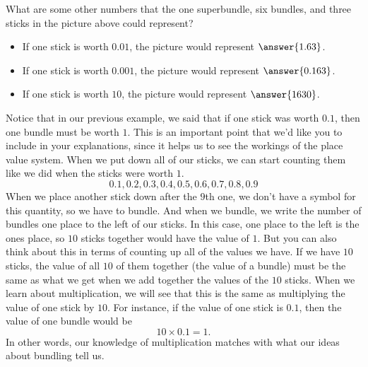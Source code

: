 \documentclass{ximera}
\begin{document}
\begin{example}



\end{example}

\begin{question}
What are some other numbers that the one superbundle, six bundles, and three sticks in the picture above could represent?

\begin{prompt}
\begin{itemize}
	\item If one stick is worth $0.01$, the picture would represent $\answer{1.63}$.
	\item If one stick is worth $0.001$, the picture would represent $\answer{0.163}$.
	\item If one stick is worth $10$, the picture would represent $\answer{1630}$.
\end{itemize}
\end{prompt}
\end{question}

Notice that in our previous example, we said that if one stick was worth $0.1$, then one bundle must be worth $1$. This is an important point that we'd like you to include in your explanations, since it helps us to see the workings of the place value system. When we put down all of our sticks, we can start counting them like we did when the sticks were worth $1$.
\[
0.1, 0.2, 0.3, 0.4, 0.5, 0.6, 0.7, 0.8, 0.9
\]
When we place another stick down after the $9$th one, we don't have a symbol for this quantity, so we have to bundle. And when we bundle, we write the number of bundles one place to the left of our sticks. In this case, one place to the left is the ones place, so $10$ sticks together would have the value of $1$. But you can also think about this in terms of counting up all of the values we have. If we have $10$ sticks, the value of all $10$ of them together (the value of a bundle) must be the same as what we get when we  add together the values of the $10$ sticks. When we learn about multiplication, we will see that this is the same as multiplying the value of one stick by $10$. For instance, if the value of one stick is $0.1$, then the value of one bundle would be 
\[
10 \times 0.1 = 1.
\]
In other words, our knowledge of multiplication matches with what our ideas about bundling tell us.
\end{document}
